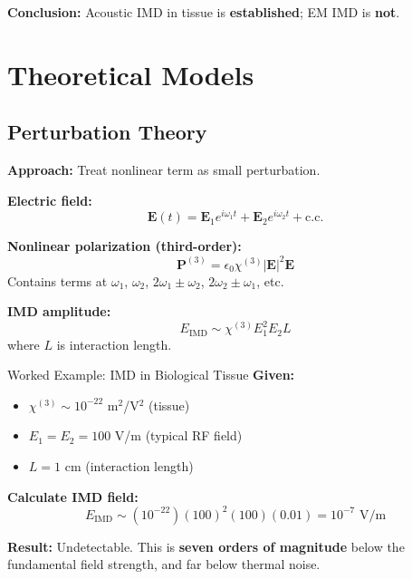\begin{keyconcept}
\textbf{Conclusion:} Acoustic IMD in tissue is \textbf{established}; EM IMD is \textbf{not}.
\end{keyconcept}

\section{Theoretical Models}

\subsection{Perturbation Theory}

\textbf{Approach:} Treat nonlinear term as small perturbation.

\textbf{Electric field:}
\begin{equation}
\label{eq:electric-field-two-tone}
\mathbf{E}(t) = \mathbf{E}_1 e^{i\omega_1 t} + \mathbf{E}_2 e^{i\omega_2 t} + \text{c.c.}
\end{equation}

\textbf{Nonlinear polarization (third-order):}
\begin{equation}
\label{eq:nonlinear-polarization}
\mathbf{P}^{(3)} = \epsilon_0 \chi^{(3)} |\mathbf{E}|^2 \mathbf{E}
\end{equation}
Contains terms at $\omega_1$, $\omega_2$, $2\omega_1 \pm \omega_2$, $2\omega_2 \pm \omega_1$, etc.

\textbf{IMD amplitude:}
\begin{equation}
\label{eq:imd-amplitude}
E_{\text{IMD}} \sim \chi^{(3)} E_1^2 E_2 L
\end{equation}
where $L$ is interaction length.

\begin{calloutbox}{Worked Example: IMD in Biological Tissue}
\textbf{Given:}
\begin{itemize}
\item $\chi^{(3)} \sim 10^{-22}$ m$^2$/V$^2$ (tissue)
\item $E_1 = E_2 = 100$ V/m (typical RF field)
\item $L = 1$ cm (interaction length)
\end{itemize}

\textbf{Calculate IMD field:}
\begin{equation}
E_{\text{IMD}} \sim (10^{-22})(100)^2(100)(0.01) = 10^{-7} \text{ V/m}
\end{equation}

\textbf{Result:} Undetectable. This is \textbf{seven orders of magnitude} below the fundamental field strength, and far below thermal noise.
\end{calloutbox}

